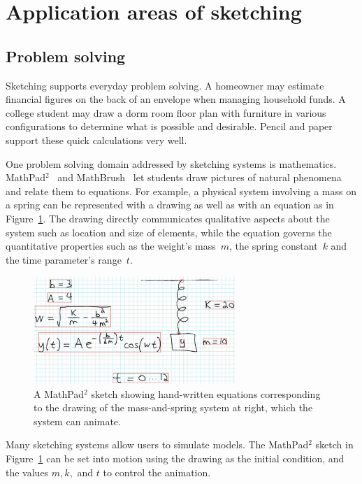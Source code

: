 \section{Application areas of sketching}
\label{sec:interaction-application-areas}

\subsection{Problem solving}

Sketching supports everyday problem solving. A homeowner may estimate
financial figures on the back of an envelope when managing household
funds. A college student may draw a dorm room floor plan with
furniture in various configurations to determine what is possible and
desirable. Pencil and paper support these quick calculations very
well.

One problem solving domain addressed by sketching systems is
mathematics. MathPad$^{2}$~\cite{laviola-mathpad} and
MathBrush~\cite{labahn-mathbrush} let students draw pictures of
natural phenomena and relate them to equations. For example, a
physical system involving a mass on a spring can be represented with a
drawing as well as with an equation as in
Figure~\ref{fig:mathpad2}. The drawing directly communicates
qualitative aspects about the system such as location and size of
elements, while the equation governs the quantitative properties such
as the weight's mass~$m$, the spring constant~$k$ and the time
parameter's range~$t$.

\begin{figure}[h]
   \centering \includegraphics[width=3in]{img/mathpad2.pdf} 

   \caption{A MathPad$^{2}$ sketch showing hand-written equations
   corresponding to the drawing of the mass-and-spring system at
   right, which the system can animate.}

   \label{fig:mathpad2}
\end{figure}

Many sketching systems allow users to simulate models. The
MathPad$^{2}$ sketch in Figure~\ref{fig:mathpad2} can be set into
motion using the drawing as the initial condition, and the values $m,
k,$ and $t$ to control the animation.

